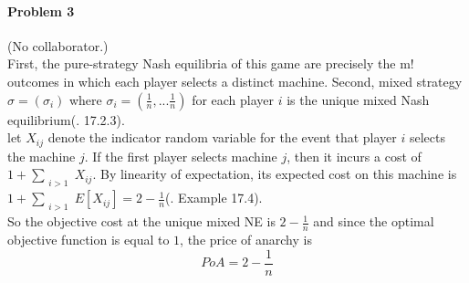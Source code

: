 \documentclass[12pt]{article}
\begin{document}
\paragraph{Problem 3} (No collaborator.)
\\
First, the pure-strategy Nash equilibria of this game are precisely 
the m! outcomes in which each player selects a distinct machine.
Second, mixed strategy $\sigma=(\sigma_i)$ where 
$\sigma_i=(\frac{1}{n},...\frac{1}{n})$ for each player $i$
is the unique mixed Nash equilibrium(\cite{NRTV07}. 17.2.3).
\\
let $X_{ij}$ denote the indicator random variable for 
the event that player $i$ selects the machine $j$.
If the first player selects machine $j$, then it incurs a cost of $\displaystyle 1+\sum_{\substack{i>1}}X_{ij}$. 
By linearity of expectation, its expected cost on this machine is $\displaystyle 1+\sum_{\substack{i>1}}E[X_{ij}]=2-\frac{1}{n}$(\cite{NRTV07}. Example 17.4).
\\
So the objective cost at the unique mixed NE is $\displaystyle 2-\frac{1}{n}$
and since the optimal objective function is equal to $1$, the price of anarchy is 
$$PoA=2-\frac{1}{n}$$



\begin{thebibliography}{99}



\end{thebibliography}
\end{document}
